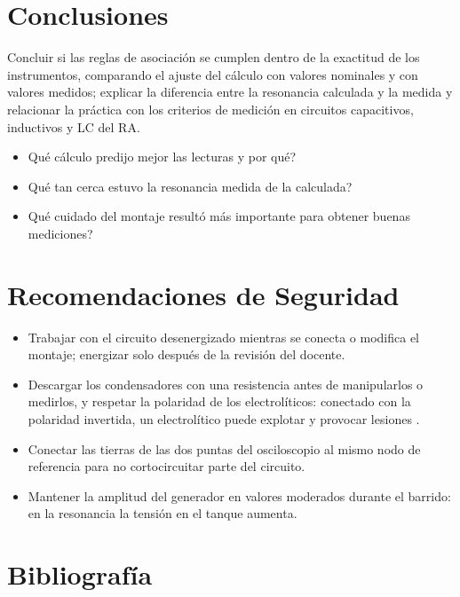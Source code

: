 \documentclass[12pt]{article}
\begin{document}
\section{Conclusiones}\label{sec:conclusiones}
Concluir si las reglas de asociación se cumplen dentro de la exactitud de los instrumentos, comparando el ajuste del cálculo con valores nominales y con valores medidos; explicar la diferencia entre la resonancia calculada y la medida y relacionar la práctica con los criterios de medición en circuitos capacitivos, inductivos y LC del RA.
\lineablanco
\begin{itemize}
  \item \textquestiondown{}Qué cálculo predijo mejor las lecturas y por qué?
  \item \textquestiondown{}Qué tan cerca estuvo la resonancia medida de la calculada?
  \item \textquestiondown{}Qué cuidado del montaje resultó más importante para obtener buenas mediciones?
\end{itemize}

\section{Recomendaciones de Seguridad}\label{sec:seguridad}
\begin{itemize}
  \item Trabajar con el circuito desenergizado mientras se conecta o modifica el montaje; energizar solo después de la revisión del docente.
  \item Descargar los condensadores con una resistencia antes de manipularlos o medirlos, y respetar la polaridad de los electrolíticos: conectado con la polaridad invertida, un electrolítico puede explotar y provocar lesiones \cite{ref1}.
  \item Conectar las tierras de las dos puntas del osciloscopio al mismo nodo de referencia para no cortocircuitar parte del circuito.
  \item Mantener la amplitud del generador en valores moderados durante el barrido: en la resonancia la tensión en el tanque aumenta.
\end{itemize}

\section{Bibliografía}\label{sec:bibliografia}
\nocite{*}
\bibliografia
\end{document}
